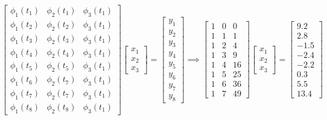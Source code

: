\documentclass[a4paper,11pt]{article}
\begin{document}
        $$
            \begin{bmatrix}
                \phi_1(t_1) & \phi_2(t_1) & \phi_3(t_1) \\
                \phi_1(t_2) & \phi_2(t_2) & \phi_3(t_1) \\
                \phi_1(t_3) & \phi_2(t_3) & \phi_3(t_1) \\
                \phi_1(t_4) & \phi_2(t_4) & \phi_3(t_1) \\
                \phi_1(t_5) & \phi_2(t_5) & \phi_3(t_1) \\
                \phi_1(t_6) & \phi_2(t_7) & \phi_3(t_1) \\
                \phi_1(t_7) & \phi_2(t_7) & \phi_3(t_1) \\
                \phi_1(t_8) & \phi_2(t_8) & \phi_3(t_1) 
            \end{bmatrix}
            \begin{bmatrix}
                x_1 \\ 
                x_2 \\
                x_3
            \end{bmatrix}
            =
            \begin{bmatrix}
                y_1 \\ 
                y_2 \\
                y_3 \\ 
                y_4 \\
                y_5 \\
                y_6 \\
                y_7 \\
                y_8
            \end{bmatrix}
            \implies
            \begin{bmatrix}
                1 & 0 & 0 \\
                1 & 1 & 1\\
                1 & 2 & 4\\
                1 & 3 & 9 \\
                1 & 4 & 16\\
                1 & 5 & 25\\
                1 & 6 & 36\\
                1 & 7 & 49
            \end{bmatrix}
            \begin{bmatrix}
                x_1 \\ 
                x_2 \\
                x_3
            \end{bmatrix}
            =
            \begin{bmatrix}
                9.2 \\ 
                2.8 \\
                -1.5 \\ 
                -2.4 \\
                -2.2 \\
                0.3 \\ 
                5.5 \\
                13.4
            \end{bmatrix}
        $$
\end{document}
